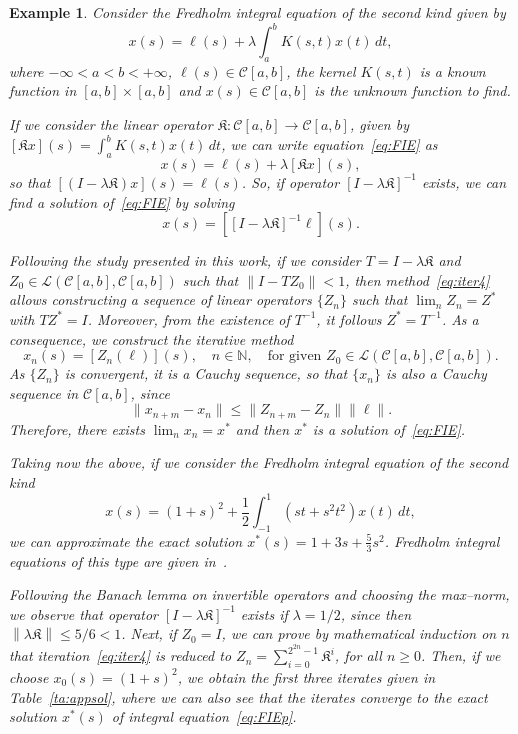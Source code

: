 \documentclass[11pt,twoside,letterpaper]{article} %
\newtheorem{example}[theorem]{Example}
\begin{document}
\begin{example}
Consider the Fredholm integral equation of the second kind given by
\begin{equation}
\label{eq:FIE}
x(s) = \ell(s) + \lambda\int_{a}^{b} K(s,t)x(t)\,dt,
\end{equation}
where $-\infty<a<b<+\infty$, $\ell(s)\in\mathcal{C}[a,b]$, the kernel ${K}(s,t)$ is a known function in $[a,b]\times[a,b]$ and $x(s)\in\mathcal{C}[a,b]$ is the unknown function to find.

If we consider the linear operator $\mathfrak{K}:\mathcal{C}[a,b]\to\mathcal{C}[a,b]$, given by $[\mathfrak{K}x](s)=\int_{a}^{b} K(s,t)x(t)\,dt$, we can write equation~\eqref{eq:FIE} as
$$
x(s) = \ell(s)+\lambda[\mathfrak{K}x](s),
$$
so that $[(I-\lambda\mathfrak{K})x](s)=\ell(s)$.
So, if operator $[I-\lambda\mathfrak{K}]^{-1}$ exists, we can find a solution of~\eqref{eq:FIE} by solving
\begin{equation}
\label{eq:eqFIE}
x(s) = \left[[I-\lambda\mathfrak{K}]^{-1}\ell\right](s).
\end{equation}

Following the study presented in this work, if we consider $T=I-\lambda\mathfrak{K}$ and $Z_{0}\in\mathcal{L}(\mathcal{C}[a,b],\mathcal{C}[a,b])$ such that $\|I-TZ_0\|<1$, then method~\eqref{eq:iter4} allows constructing a sequence of linear operators $\{Z_{n}\}$ such that $\lim_{n}Z_{n}=Z^{*}$ with $TZ^{*}=I$.
Moreover, from the existence of $T^{-1}$, it follows $Z^{*}=T^{-1}$.
As a consequence, we construct the iterative method
$$
x_{n}(s)=[Z_{n}(\ell)](s),\quad n\in\mathbb{N},
\quad\mbox{for given } Z_0\in\mathcal{L}(\mathcal{C}[a,b],\mathcal{C}[a,b]).
$$
As $\{Z_{n}\}$ is convergent, it is a Cauchy sequence, so that $\{x_{n}\}$ is also a Cauchy sequence in $\mathcal{C}[a,b]$, since
$$
\|x_{n+m}-x_{n}\| \leq \|Z_{n+m}-Z_{n}\|\|\ell\|.
$$
Therefore, there exists $\lim_{n}x_{n}=x^{*}$ and then $x^{*}$ is a solution of~\eqref{eq:FIE}.

Taking now the above, if we consider the Fredholm integral equation of the second kind
\begin{equation}
\label{eq:FIEp}
x(s) = (1+s)^{2} + \frac{1}{2} \int_{-1}^{1} \left(st+s^2t^2\right)x(t)\,dt,
\end{equation}
we can approximate the exact solution $x^{*}(s)=1+3s+\frac{5}{3}s^2$. Fredholm integral equations of this type are given in~\cite{Waz}.

Following the Banach lemma on invertible operators and choosing the max--norm, we observe that operator $[I-\lambda\mathfrak{K}]^{-1}$ exists if $\lambda=1/2$, since then $\left\|\lambda\mathfrak{K}\right\|\leq 5/6<1$.
Next, if $Z_0=I$, we can prove by mathematical induction on $n$ that iteration~\eqref{eq:iter4} is reduced to $Z_{n}=\sum_{i=0}^{2^{2n}-1}\mathfrak{K}^{i}$, for all $n\geq0$. Then, if we choose $x_{0}(s) = (1+s)^{2}$, we obtain the first three iterates given in Table~\ref{ta:appsol}, where we can also see that the iterates converge to the exact solution $x^{*}(s)$ of integral equation~\eqref{eq:FIEp}.


\end{example}
\end{document}

